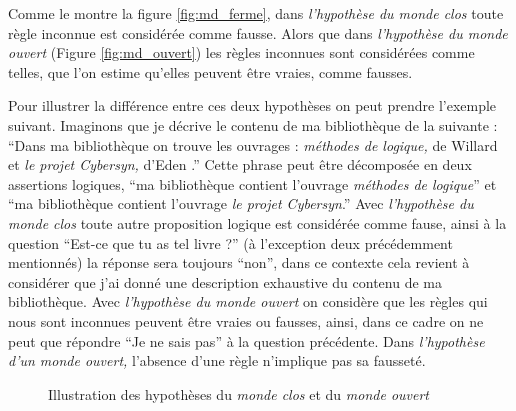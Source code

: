 Comme le montre la figure \ref{fig:md_ferme}, dans \emph{l'hypothèse
  du monde clos} toute règle inconnue est considérée comme
fausse. Alors que dans \emph{l'hypothèse du monde ouvert} (Figure
\ref{fig:md_ouvert}) les règles inconnues sont considérées comme
telles, \ie que l'on estime qu'elles peuvent être vraies, comme
fausses.

Pour illustrer la différence entre ces deux hypothèses on peut prendre
l'exemple suivant. Imaginons que je décrive le contenu de ma
bibliothèque de la suivante : \enquote{Dans ma bibliothèque on trouve
  les ouvrages : \emph{méthodes de logique,} de Willard  et
  \emph{le projet \emph{Cybersyn},} d'Eden .} Cette phrase
peut être décomposée en deux assertions logiques, \enquote{ma
  bibliothèque contient l'ouvrage \emph{méthodes de logique}} et
\enquote{ma bibliothèque contient l'ouvrage \emph{le projet
    \emph{Cybersyn}}.} Avec \emph{l'hypothèse du monde clos} toute
autre proposition logique est considérée comme fause, ainsi à la
question \enquote{Est-ce que tu as tel livre ?} (à l'exception deux
précédemment mentionnés) la réponse sera toujours \enquote{non}, dans
ce contexte cela revient à considérer que j'ai donné une description
exhaustive du contenu de ma bibliothèque. Avec \emph{l'hypothèse du
  monde ouvert} on considère que les règles qui nous sont inconnues
peuvent être vraies ou fausses, ainsi, dans ce cadre on ne peut que
répondre \enquote{Je ne sais pas} à la question précédente. Dans
\emph{l'hypothèse d'un monde ouvert,} l’absence d'une règle n'implique
pas sa fausseté.

\begin{figure}
  \centering
  \hspace{3cm}
  \caption{Illustration des hypothèses du \emph{monde clos} et du
    \emph{monde ouvert}}
  \label{fig:comp_md}
\end{figure}


